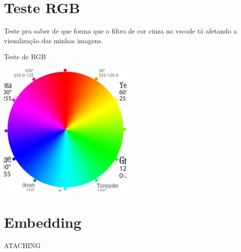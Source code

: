
\chapter{Teste RGB}

Teste pra saber de que forma que o filtro de cor cinza no vscode tá afetando a visualização das minhas imagens.

\begin{MyCenteredFigure} \caption{Teste de RGB}
  \includegraphics[width=0.5\textwidth]{files/img/unused/teste RGB.png}
\end{MyCenteredFigure}

\chapter{Embedding}

ATACHING












